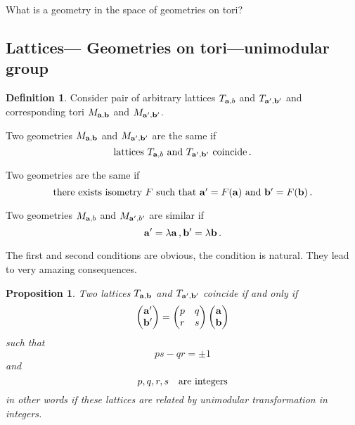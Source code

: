 \documentclass[12pt]{article}
\newtheorem{proposition}{Proposition}
\theoremstyle{definition}
\newtheorem{definition}{Definition}%
\numberwithin{equation}{section}
\begin{document}
  What is a geometry in the space
of geometries on tori?


\subsection {Lattices---
Geometries on tori---unimodular group }

\begin{definition}
Consider pair of arbitrary 
lattices $T_{{\bf a},b}$
and $T_{{\bf a}',{\bf b}'}$ and corresponding tori
  $M_{{\bf a},{\bf b}}$ and $M_{{\bf a}',{\bf b}'}$.

\smallskip
Two geometries 
  $M_{{\bf a},{\bf b}}$ and $M_{{\bf a}',{\bf b}'}$
are the same if 
    \begin{equation}\label{sim1}
\hbox{lattices $T_{{\bf a},b}$ and $T_{{\bf a}',{\bf b}'}$
coincide}\,.
   \end{equation}

\smallskip

Two geometries are the same if
      \begin{equation}\label{sim2}
\hbox{there exists isometry $F$ such that
${\bf a}'=F({\bf a})$ and ${\bf b}'=F({\bf b})$\,.}
   \end{equation}


Two geometries  $M_{{\bf a},b}$
and $M_{{\bf a}',b'}$ are similar if 
       \begin{equation}\label{sim3}
{\bf a}'=\lambda{\bf a}\,, {\bf b}'=\lambda {\bf b}\,.
   \end{equation}


\end{definition}

The first and second  conditions are obvious,
the condition is natural. 
They lead
to very amazing consequences.

\m

\begin{proposition}
Two lattices $T_{{\bf a},{\bf b}}$ and $T_{{\bf a}',{\bf b}'}$
coincide if and only if
            $$
  \begin{pmatrix}
      {\bf a}'\cr
       {\bf b}'\cr
  \end{pmatrix}=  
     \begin{pmatrix}
      p & q\cr
        r & s\cr
  \end{pmatrix}
     \begin{pmatrix}
      {\bf a}\cr
       {\bf b}\cr
  \end{pmatrix}
            $$
such that
      $$
    ps-qr=\pm 1
      $$
and
       $$
p,q,r,s \quad \hbox {are integers}
       $$
in other words if these lattices are related by
unimodular transformation in integers.


\end{proposition}
\end{document}
